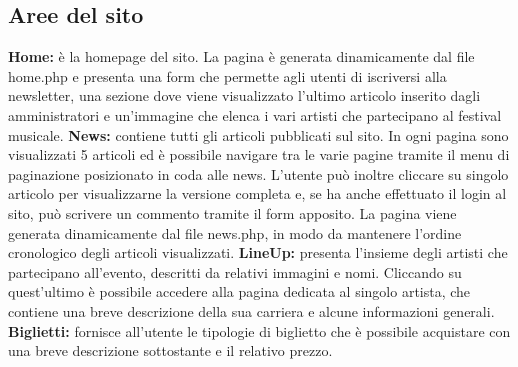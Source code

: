 \documentclass[10pt, a4paper]{article}
\begin{document}
\subsection{Aree del sito}
\textbf{Home: }è la homepage del sito. La pagina è generata dinamicamente dal file home.php e presenta una form che permette agli utenti di iscriversi alla newsletter, una sezione dove viene visualizzato l'ultimo articolo inserito dagli amministratori e un'immagine che elenca i vari artisti che partecipano al festival musicale.
\newline \textbf{News: }contiene tutti gli articoli pubblicati sul sito. In ogni pagina sono visualizzati 5 articoli ed è possibile navigare tra le varie pagine tramite il menu di paginazione posizionato in coda alle news. L'utente può inoltre cliccare su singolo articolo per visualizzarne la versione completa e, se ha anche effettuato il login al sito, può scrivere un commento tramite il form apposito. La pagina viene generata dinamicamente dal file news.php, in modo da mantenere l'ordine cronologico degli articoli visualizzati.
\newline \textbf{LineUp: }presenta l'insieme degli artisti che partecipano all'evento, descritti da relativi immagini e nomi. Cliccando su quest'ultimo è possibile accedere alla pagina dedicata al singolo artista, che contiene una breve descrizione della sua carriera e alcune informazioni generali.
\newline \textbf{Biglietti: }fornisce all'utente le tipologie di biglietto che è possibile acquistare con una breve descrizione sottostante e il relativo prezzo.
\end{document}
